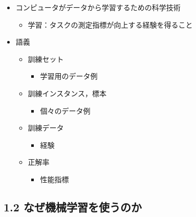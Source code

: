 \begin{itemize}
\tightlist
\item
  コンピュータがデータから学習するための科学技術

  \begin{itemize}
  \tightlist
  \item
    学習：タスクの測定指標が向上する経験を得ること
  \end{itemize}
\item
  語義

  \begin{itemize}
  \tightlist
  \item
    訓練セット

    \begin{itemize}
    \tightlist
    \item
      学習用のデータ例
    \end{itemize}
  \item
    訓練インスタンス，標本

    \begin{itemize}
    \tightlist
    \item
      個々のデータ例
    \end{itemize}
  \item
    訓練データ

    \begin{itemize}
    \tightlist
    \item
      経験
    \end{itemize}
  \item
    正解率

    \begin{itemize}
    \tightlist
    \item
      性能指標
    \end{itemize}
  \end{itemize}
\end{itemize}

\hypertarget{ux306aux305cux6a5fux68b0ux5b66ux7fd2ux3092ux4f7fux3046ux306eux304b}{%
\subsection{1.2
なぜ機械学習を使うのか}\label{ux306aux305cux6a5fux68b0ux5b66ux7fd2ux3092ux4f7fux3046ux306eux304b}}

